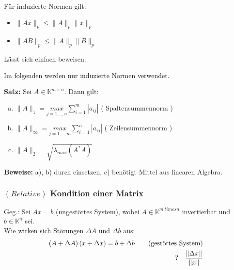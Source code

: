 Für induzierte Normen gilt:

\begin{itemize}
\item{$\|Ax\|_p \leq \|A\|_p \|x\|_p$}
\item{$\|A B\|_p \leq \|A\|_p \|B\|_p$}
\end{itemize}
Lässt sich einfach beweisen.

Im folgenden werden nur induzierte Normen verwendet.

\textbf{Satz:}
Sei $A \in \mathbb{K}^{m \times n}$. Dann gilt:
\begin{enumerate}[a)]
  \item{$\|A\|_1 = \underset{j = 1,..,n}{max} \sum\limits_{i=1}^{m}{\left|a_{ij}\right|}$ ( Spaltensummennorm )}
  \item{$\|A\|_{\infty} = \underset{j = 1,..,m}{max} \sum\limits_{i=1}^{n}{\left|a_{ij}\right|}$ ( Zeilensummennorm )}
  \item{$\|A\|_2 = \sqrt{\lambda_{max}\left(A^*A\right)}$}
\end{enumerate}
\textbf{Beweise:} a), b) durch einsetzen, c) benötigt Mittel aus linearen Algebra.

\subsubsection{$\left(Relative\right)$ Kondition einer Matrix}
Geg.: Sei $Ax = b$ (ungestörtes System), wobei
$A \in \mathbb{K}^{m \ times n}$ invertierbar und $b \in \mathbb{K}^n$ sei.  \\
Wie wirken sich Störungen $\Delta A$ und $\Delta b$ aus:  \\
\begin{align*}
  \left(A+\Delta A\right) \left(x+\Delta x\right)=b+\Delta b  \tag{gestörtes System}\\
  ? \quad \frac{\left\lVert \Delta x \right\rVert}{\left\lVert x \right\rVert} 
\end{align*}

